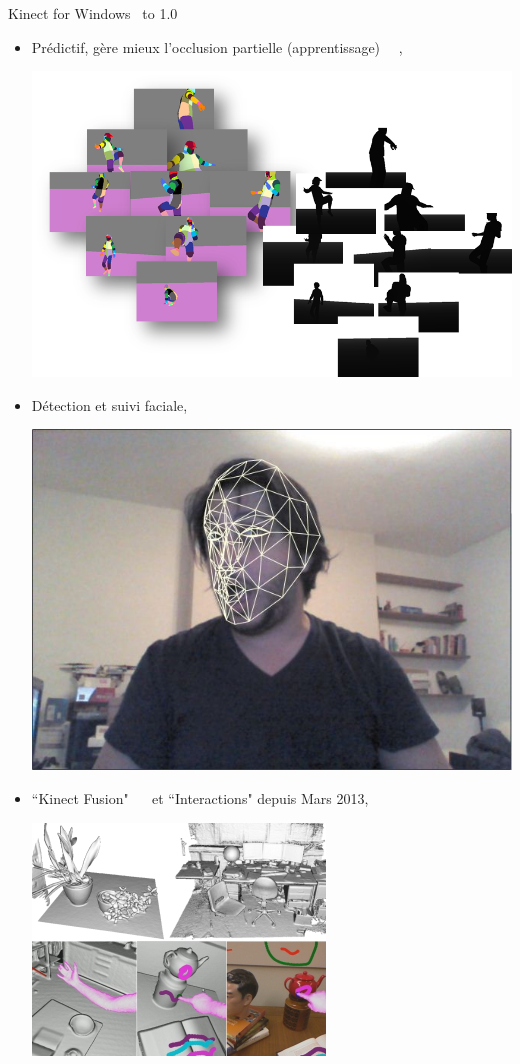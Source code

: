 \begin{frame}{Kinect for Windows~\cite{microsoft_vs_openni_2}}
\vbox to 1.0\textheight
{
\begin{itemize}
  \item<1-> Prédictif, gère mieux l'occlusion partielle (apprentissage)
                ~\cite{how_you_become_the_controller}~\cite{shotton2011},
  {
    \vfill
    \begin{center}
    \includegraphics[width=0.7\linewidth]{../images/kinect_learning}
    \end{center}
  }
  \item<2-> Détection et suivi faciale,
  {
    \vfill
    \begin{center}
    \includegraphics[width=0.5\linewidth]{../images/kinect_face_track}
    \end{center}
  }
  \item<3-> ``Kinect Fusion" ~\cite{newcombe2011}~\cite{izadi2011} et ``Interactions" depuis Mars 2013,
  {
    \vfill
    \begin{center}
    \includegraphics[width=0.4\linewidth]{../images/kinect_fusion}
    \end{center}
  }

\end{itemize}
\vfill
}
\end{frame}

